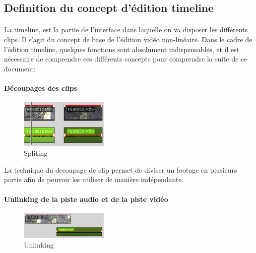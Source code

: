 \subsection{Definition du concept d'édition timeline}

\paragraph{}

La timeline, est la partie de l'interface dans laquelle on va disposer les
différents clips. Il s'agit du concept de base de l'édition vidéo non-linéaire.
Dans le cadre de l'édition timeline, quelques fonctions sont absolument
indispensables, et il est nécessaire de comprendre ces différents concepts
pour comprendre la suite de ce document:

\paragraph{Découpages des clips}
  \begin{figure}
    \vspace{-20pt}
    \begin{center}
      \includegraphics[width=0.38\textwidth]{images/splited}
    \end{center}
    \vspace{-20pt}
    \caption{Spliting}
    \label{Yes}
    \vspace{-10pt}
  \end{figure}

La technique du decoupage de clip permet de diviser un footage en plusieurs
partie afin de pouvoir les utiliser de manière indépendante.

\paragraph{}

\paragraph{Unlinking de la piste audio et de la piste vidéo}
  \begin{figure}
    \vspace{-20pt}
    \begin{center}
      \includegraphics[width=0.38\textwidth]{images/unlinked}
    \end{center}
    \vspace{-30pt}
    \caption{Unlinking}
    \label{Yes}
    \vspace{-10pt}
  \end{figure}

